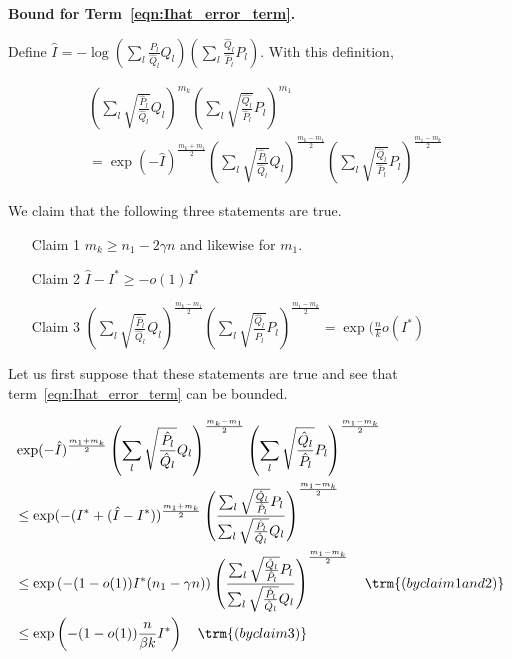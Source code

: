 \documentclass{article}
\begin{document}
\textbf{Bound for Term~\ref{eqn:Ihat_error_term}.}


Define 
$\hat{I} = - \log \left( \sum_l \frac{\hat{P}_l}{\hat{Q}_l} Q_l \right) \left( \sum_l \frac{\hat{Q}_l}{\hat{P}_l} P_l \right) $. 
With this definition, 

\begin{align*}
& \left( \sum_l \sqrt{\frac{\hat{P}_l}{\hat{Q}_l} } Q_l \right)^{m_k} 
       \left( \sum_l \sqrt{\frac{\hat{Q_l}}{\hat{P}_l} } P_l \right)^{m_1} \\
&= \exp( - \hat{I} )^{\frac{m_k + m_1}{2}}  \left( \sum_l \sqrt{\frac{\hat{P}_l}{\hat{Q}_l}} Q_l \right)^{\frac{m_k - m_1}{2}} 
 \left( \sum_l \sqrt{\frac{\hat{Q}_l}{\hat{P}_l}} P_l \right)^{\frac{m_1 - m_k}{2}} 
\end{align*}

We claim that the following three statements are true. 
\begin{enumerate}
\item[Claim 1] $m_k \geq n_1 - 2 \gamma n$ and likewise for $m_1$.
\item[Claim 2] $\hat{I} - I^* \geq - o(1) I^*$
\item[Claim 3] $\left( \sum_l \sqrt{\frac{\hat{P}_l}{\hat{Q}_l}} Q_l \right)^{\frac{m_k - m_1}{2}} 
 \left( \sum_l \sqrt{\frac{\hat{Q}_l}{\hat{P}_l}} P_l \right)^{\frac{m_1 - m_k}{2}} = \exp(\frac{n}{k}  o(I^*)  $
\end{enumerate}

Let us first suppose that these statements are true and see that term~\ref{eqn:Ihat_error_term} can be bounded. 


\begin{align*}
& \exp( - \hat{I} )^{\frac{m_1 + m_k}{2}}  \left( \sum_l \sqrt{\frac{\hat{P}_l}{\hat{Q}_l}} Q_l \right)^{\frac{m_k - m_1}{2}} 
 \left( \sum_l \sqrt{\frac{\hat{Q}_l}{\hat{P}_l}} P_l \right)^{\frac{m_1 - m_k}{2}}  \\
&\leq  \exp( - (I^* + (\hat{I} - I^*) )^{\frac{m_1 + m_k}{2}}  
 \left( \frac{\sum_l \sqrt{\frac{\hat{Q}_l}{\hat{P}_l}} P_l}
             {\sum_l \sqrt{\frac{\hat{P}_l}{\hat{Q}_l}} Q_l} \right)^{\frac{m_1 - m_k}{2}}  
  \\
&\leq \exp \left( - (1-o(1)) I^* (n_1 - \gamma n) \right) 
   \left( \frac{\sum_l \sqrt{\frac{\hat{Q}_l}{\hat{P}_l}} P_l}
             {\sum_l \sqrt{\frac{\hat{P}_l}{\hat{Q}_l}} Q_l} \right)^{\frac{m_1 - m_k}{2}}  
   \quad \trm{(by claim 1 and 2)}\\
&\leq \exp \left( - (1-o(1)) \frac{n}{\beta k} I^*  \right) 
   \quad \trm{(by claim 3)}
\end{align*}
\end{document}
